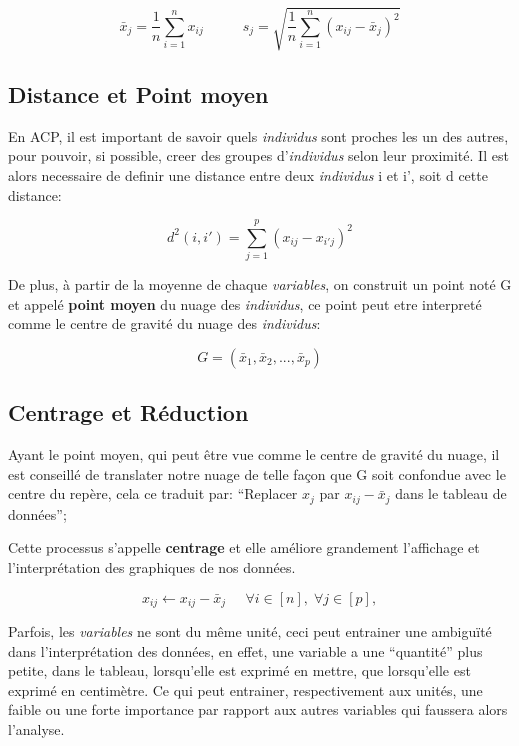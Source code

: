 \documentclass{article}
\begin{document}
\begin{equation*}
\bar{x}_j=\frac{1}{n}\sum_{i=1}^{n}{x_{ij}} \;\;\;\;\;\;\;\;\;\; s_j=\sqrt{\frac{1}{n}\sum_{i=1}^{n}{(x_{ij}-\bar{x}_j)^2}}
\end{equation*}

\subsection{Distance et Point moyen}
En ACP, il est important de savoir quels \textit{individus} sont proches les un des autres, pour pouvoir, si possible, creer des groupes d'\textit{individus} selon leur proximité. Il est alors necessaire de definir une distance entre deux \textit{individus} i et i', soit d cette distance:

\begin{equation*}
d^2(i,i')=\sum_{j=1}^{p}{(x_{ij}-x_{i'j})^2} 
\end{equation*}

\newpage

De plus, à partir de la moyenne de chaque \textit{variables}, on construit un point noté G et appelé \textbf{point moyen} du nuage des \textit{individus}, ce point peut etre interpreté comme le centre de gravité du nuage des \textit{individus}:

\begin{equation*}
G=(\bar{x}_1,\bar{x}_2,...,\bar{x}_p)
\end{equation*}

\subsection{Centrage et Réduction}
Ayant le point moyen, qui peut être vue comme le centre de gravité du nuage, il est conseillé de translater notre nuage de telle façon que G soit confondue avec le centre du repère, cela ce traduit par: ``Replacer $x_j$ par $x_{ij}-\bar{x}_j$ dans le tableau de données'';
\newline

Cette processus s'appelle \textbf{centrage} et elle améliore grandement l'affichage et l'interprétation des graphiques de nos données.

\begin{equation*}
x_{ij} \leftarrow x_{ij}-\bar{x}_j \;\;\;\;\; \forall i \in [n], \; \forall j \in [p],
\end{equation*}
\newline

Parfois, les \textit{variables} ne sont du même unité, ceci peut entrainer une ambiguïté dans l'interprétation des données, en effet, une variable a une ``quantité'' plus petite, dans le tableau, lorsqu'elle est exprimé en mettre, que lorsqu'elle est exprimé en centimètre. Ce qui peut entrainer, respectivement aux unités, une faible ou une forte importance par rapport aux autres variables qui faussera alors l'analyse.
\newline
\end{document}
